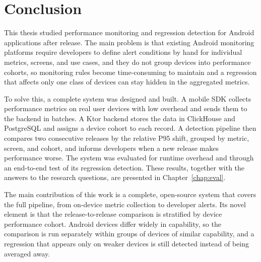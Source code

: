 \chapter{Conclusion}
\label{chap:conclusion}

This thesis studied performance monitoring and regression detection for Android applications after release. The main problem is that existing Android monitoring platforms require developers to define alert conditions by hand for individual metrics, screens, and use cases, and they do not group devices into performance cohorts, so monitoring rules become time-consuming to maintain and a regression that affects only one class of devices can stay hidden in the aggregated metrics.

To solve this, a complete system was designed and built. A mobile SDK collects performance metrics on real user devices with low overhead and sends them to the backend in batches. A Ktor backend stores the data in ClickHouse and PostgreSQL and assigns a device cohort to each record. A detection pipeline then compares two consecutive releases by the relative P95 shift, grouped by metric, screen, and cohort, and informs developers when a new release makes performance worse. The system was evaluated for runtime overhead and through an end-to-end test of its regression detection. These results, together with the answers to the research questions, are presented in Chapter~\ref{chap:eval}.

The main contribution of this work is a complete, open-source system that covers the full pipeline, from on-device metric collection to developer alerts. Its novel element is that the release-to-release comparison is stratified by device performance cohort. Android devices differ widely in capability, so the comparison is run separately within groups of devices of similar capability, and a regression that appears only on weaker devices is still detected instead of being averaged away.